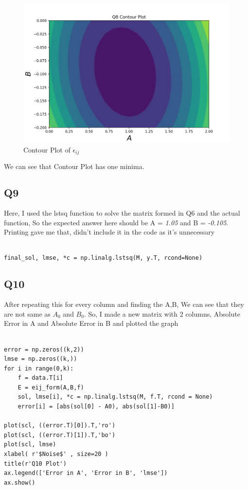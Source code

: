 \documentclass[12pt, a4paper]{report}
\begin{document}
\begin{figure}[!tbh]
   	\centering
   	\includegraphics[scale=0.5]{Qn8.png}
   	\caption{Contour Plot of $\epsilon_{ij}$}
   	\label{fig:sample}
   \end{figure}

We can see that Contour Plot has one minima.

 \subsection{Q9}
 Here, I used the lstsq function to solve the matrix formed in Q6 and the actual function, So the expected answer here should be A = \textit{1.05} and B = \textit{-0.105}. Printing gave me that, didn't include it in the code as it's unnecessary
  \begin{Verbatim}
  
final_sol, lmse, *c = np.linalg.lstsq(M, y.T, rcond=None)

\end{Verbatim}

 \subsection{Q10}
 After repeating this for every column and finding the A,B, We can see that they are not same as $A_0$ and $B_0$. So, I made a new matrix with 2 columns, Absolute Error in A and Absolute Error in B and plotted the graph
  \begin{Verbatim}
  
error = np.zeros((k,2))
lmse = np.zeros((k,))
for i in range(0,k):
    f = data.T[i]
    E = eij_form(A,B,f)
    sol, lmse[i], *c = np.linalg.lstsq(M, f.T, rcond = None)
    error[i] = [abs(sol[0] - A0), abs(sol[1]-B0)]

plot(scl, ((error.T)[0]).T,'ro')
plot(scl, ((error.T)[1]).T,'bo')
plot(scl, lmse)
xlabel( r'$Noise$' , size=20 )
title(r'Q10 Plot')
ax.legend(['Error in A', 'Error in B', 'lmse'])
ax.show()

\end{Verbatim}
 
\end{document}
